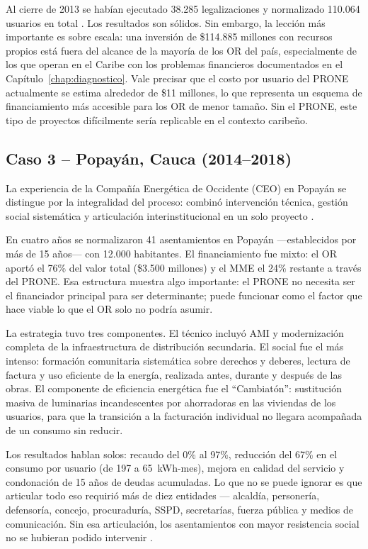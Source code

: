 Al cierre de 2013 se habían ejecutado 38.285 legalizaciones y normalizado 110.064 usuarios en total \parencite{MendezFuentes2013}. Los resultados son sólidos. Sin embargo, la lección más importante es sobre escala: una inversión de \$114.885 millones con recursos propios está fuera del alcance de la mayoría de los OR del país, especialmente de los que operan en el Caribe con los problemas financieros documentados en el Capítulo~\ref{chap:diagnostico}. Vale precisar que el costo por usuario del PRONE actualmente se estima alrededor de \$11 millones, lo que representa un esquema de financiamiento más accesible para los OR de menor tamaño. Sin el PRONE, este tipo de proyectos difícilmente sería replicable en el contexto caribeño.

\subsection{Caso 3 -- Popayán, Cauca (2014--2018)}
\label{subsec:caso_popayan}

La experiencia de la Compañía Energética de Occidente (CEO) en Popayán se distingue por la integralidad del proceso: combinó intervención técnica, gestión social sistemática y articulación interinstitucional en un solo proyecto \parencite{SerranoRueda2019}.

En cuatro años se normalizaron 41 asentamientos en Popayán —establecidos por más de 15 años— con 12.000 habitantes. El financiamiento fue mixto: el OR aportó el 76\% del valor total (\$3.500 millones) y el MME el 24\% restante a través del PRONE. Esa estructura muestra algo importante: el PRONE no necesita ser el financiador principal para ser determinante; puede funcionar como el factor que hace viable lo que el OR solo no podría asumir.

La estrategia tuvo tres componentes. El técnico incluyó AMI y modernización completa de la infraestructura de distribución secundaria. El social fue el más intenso: formación comunitaria sistemática sobre derechos y deberes, lectura de factura y uso eficiente de la energía, realizada antes, durante y después de las obras. El componente de eficiencia energética fue el ``Cambiatón'': sustitución masiva de luminarias incandescentes por ahorradoras en las viviendas de los usuarios, para que la transición a la facturación individual no llegara acompañada de un consumo sin reducir.

Los resultados hablan solos: recaudo del 0\% al 97\%, reducción del 67\% en el consumo por usuario (de 197 a 65~kWh-mes), mejora en calidad del servicio y condonación de 15 años de deudas acumuladas. Lo que no se puede ignorar es que articular todo eso requirió más de diez entidades — alcaldía, personería, defensoría, concejo, procuraduría, SSPD, secretarías, fuerza pública y medios de comunicación. Sin esa articulación, los asentamientos con mayor resistencia social no se hubieran podido intervenir \parencite{SerranoRueda2019}.

